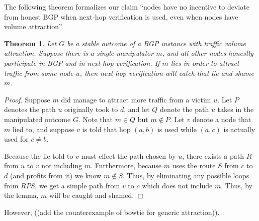 \documentclass[12pt]{article}
\newtheorem{theorem}{Theorem}
\newtheorem{conjecture}{Conjecture}
\begin{document}
  The following theorem formalizes our claim ``nodes have no incentive
  to deviate from honest BGP when next-hop verification is used,
  even when nodes have volume attraction''.
  \begin{theorem}
    Let $G$ be a stable outcome of a BGP instance with traffic volume attraction.
    Suppose there is a single manipulator $m$,
    and all other nodes honestly participate in BGP and in next-hop verification.
    If $m$ lies in order to attract traffic from some node $u$,
    then next-hop verification will catch that lie and shame $m$.
  \end{theorem}
  \begin{proof}
    Suppose $m$ did manage to attract more traffic from a victim $u$.
    Let $P$ denotes the path $u$ originally took to $d$,
    and let $Q$ denote the path $u$ takes in the manipulated outcome $G$.
    Note that $m\in Q$ but $m\notin P$.
    Let $v$ denote a node that $m$ lied to, and suppose $v$ is told
    that hop $(a,b)$ is used while $(a,c)$ is actually used for $c\ne b$.

    Because the lie told to $v$ must effect the path chosen by $u$,
    there exists a path $R$ from $u$ to $v$ not including $m$.
    Furthermore, because $m$ uses the route $S$ from $c$ to $d$
    (and profits from it) we know $m\notin S$.
    Thus, by eliminating any possible loops from $RPS$,
    we get a simple path from $v$ to $c$ which does not include $m$.
    Thus, by the lemma, $m$ will be caught and shamed.
  \end{proof}

  However, ((add the counterexample of bowtie for generic attraction)).

\end{document}
